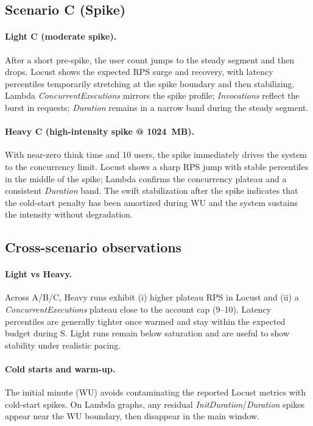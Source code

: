 \documentclass[11pt,a4paper]{article}
\begin{document}
\subsection{Scenario C (Spike)}\label{subsec:resC}

\paragraph{Light C (moderate spike).}
After a short pre-spike, the user count jumps to the steady segment and then drops. Locust shows the expected RPS surge and recovery, with latency percentiles temporarily stretching at the spike boundary and then stabilizing. Lambda \emph{ConcurrentExecutions} mirrors the spike profile; \emph{Invocations} reflect the burst in requests; \emph{Duration} remains in a narrow band during the steady segment.

\paragraph{Heavy C (high-intensity spike @ \SI{1024}{MB}).}
With near-zero think time and 10 users, the spike immediately drives the system to the concurrency limit. Locust shows a sharp RPS jump with stable percentiles in the middle of the spike; Lambda confirms the concurrency plateau and a consistent \emph{Duration} band. The swift stabilization after the spike indicates that the cold-start penalty has been amortized during WU and the system sustains the intensity without degradation.

\subsection{Cross-scenario observations}

\paragraph{Light vs Heavy.}
Across A/B/C, Heavy runs exhibit (i) higher plateau RPS in Locust and (ii) a \emph{ConcurrentExecutions} plateau close to the account cap (9--10). Latency percentiles are generally tighter once warmed and stay within the expected budget during S. Light runs remain below saturation and are useful to show stability under realistic pacing.

\paragraph{Cold starts and warm-up.}
The initial minute (WU) avoids contaminating the reported Locust metrics with cold-start spikes. On Lambda graphs, any residual \emph{InitDuration}/\emph{Duration} spikes appear near the WU boundary, then disappear in the main window.
\end{document}
